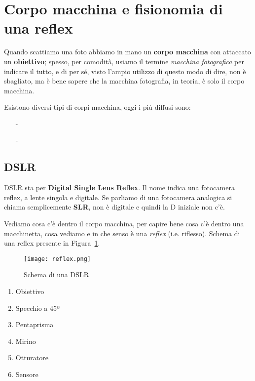 \section{Corpo macchina e fisionomia di una reflex} \label{sec:fisionomia}

Quando scattiamo una foto abbiamo in mano un \textbf{corpo macchina} con attaccato un \textbf{obiettivo}; spesso, per comodità, usiamo il termine \textit{macchina fotografica} per indicare il tutto, e di per sé, visto l'ampio utilizzo di questo modo di dire, non è sbagliato, ma è bene sapere che la macchina fotografia, in teoria, è solo il corpo macchina.

Esistono diversi tipi di corpi macchina, oggi i più diffusi sono:
\begin{itemize}
    \item[-] 
    \item[-] 
\end{itemize}


\subsection{DSLR} \label{subsec:dslr}
DSLR sta per \textbf{Digital Single Lens Reflex}.\newline
Il nome indica una fotocamera reflex, a lente singola e digitale. Se parliamo di una fotocamera analogica si chiama semplicemente \textbf{SLR}, non è digitale e quindi la D iniziale non c'è.

Vediamo cosa c'è dentro il corpo macchina, per capire bene cosa c'è dentro una macchinetta, cosa vediamo e in che senso è una \textit{reflex} (i.e. riflesso).
Schema di una reflex presente in Figura~\ref{fig:dslr_schema}.

\setlength{\columnsep}{2.8cm}
\begin{multicols}{2}

    \begin{figure}%
        \texttt{[image: reflex.png]}
        \caption{Schema di una DSLR}
        \label{fig:dslr_schema}
    \end{figure}

    \columnbreak

    \begin{enumerate}
        \setcounter{enumi}{0}
        \item Obiettivo
        \item Specchio a 45º
        \item Pentaprisma
        \item Mirino
        \item Otturatore
        \item Sensore
    \end{enumerate}
\end{multicols}

